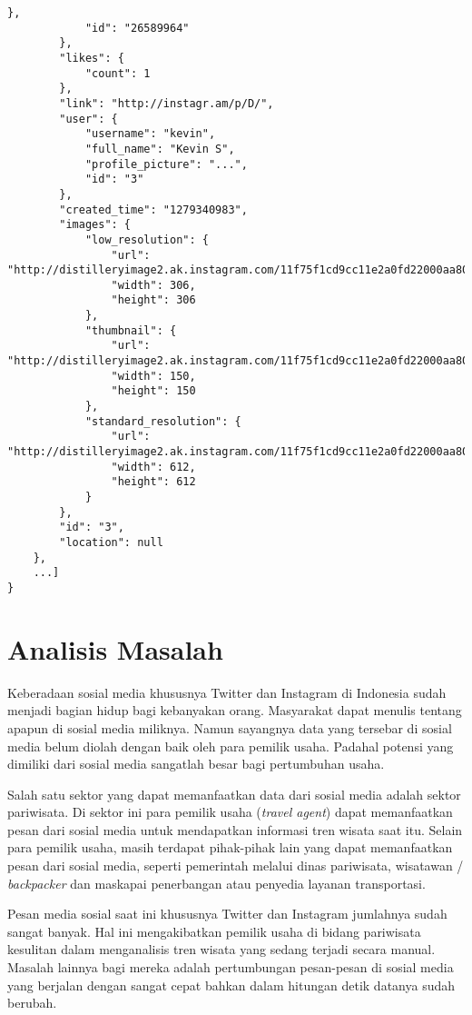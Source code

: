 \begin{lstlisting}[basicstyle=\tiny,caption=Response Tag Endpoint Media Recent,label={lst:response_tag_endpoint_media}]
            },
            "id": "26589964"
        },
        "likes": {
            "count": 1
        },
        "link": "http://instagr.am/p/D/",
        "user": {
            "username": "kevin",
            "full_name": "Kevin S",
            "profile_picture": "...",
            "id": "3"
        },
        "created_time": "1279340983",
        "images": {
            "low_resolution": {
                "url": "http://distilleryimage2.ak.instagram.com/11f75f1cd9cc11e2a0fd22000aa8039a_6.jpg",
                "width": 306,
                "height": 306
            },
            "thumbnail": {
                "url": "http://distilleryimage2.ak.instagram.com/11f75f1cd9cc11e2a0fd22000aa8039a_5.jpg",
                "width": 150,
                "height": 150
            },
            "standard_resolution": {
                "url": "http://distilleryimage2.ak.instagram.com/11f75f1cd9cc11e2a0fd22000aa8039a_7.jpg",
                "width": 612,
                "height": 612
            }
        },
        "id": "3",
        "location": null
    },
    ...]
}
\end{lstlisting}

\section{Analisis Masalah}
\label{sec:analisis_masalah}
Keberadaan sosial media khususnya Twitter dan Instagram di Indonesia sudah menjadi bagian hidup bagi kebanyakan orang. Masyarakat dapat menulis tentang apapun di sosial media miliknya. Namun sayangnya data yang tersebar di sosial media belum diolah dengan baik oleh para pemilik usaha. Padahal potensi yang dimiliki dari sosial media sangatlah besar bagi pertumbuhan usaha.

Salah satu sektor yang dapat memanfaatkan data dari sosial media adalah sektor pariwisata. Di sektor ini para pemilik usaha (\textit{travel agent}) dapat memanfaatkan pesan dari sosial media untuk mendapatkan informasi tren wisata saat itu. Selain para pemilik usaha, masih terdapat pihak-pihak lain yang dapat memanfaatkan pesan dari sosial media, seperti pemerintah melalui dinas pariwisata, wisatawan / \textit{backpacker} dan maskapai penerbangan atau penyedia layanan transportasi. 

Pesan media sosial saat ini khususnya Twitter dan Instagram jumlahnya sudah sangat banyak. Hal ini mengakibatkan pemilik usaha di bidang pariwisata kesulitan dalam menganalisis tren wisata yang sedang terjadi secara manual. Masalah lainnya bagi mereka adalah pertumbungan pesan-pesan di sosial media yang berjalan dengan sangat cepat bahkan dalam hitungan detik datanya sudah berubah. 

